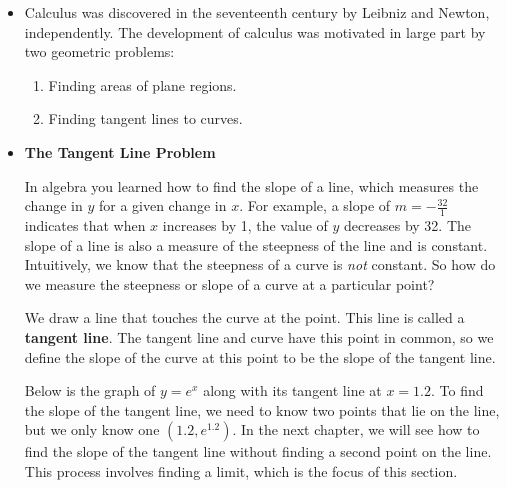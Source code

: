\documentclass{ximera}  %
\begin{document}
\begin{itemize}
    \item Calculus was discovered in the seventeenth century by
    Leibniz and Newton, independently.  The development of calculus was
    motivated in large part by two geometric problems:
    
    \begin{enumerate}
    \item Finding areas of plane regions.
    
    \item Finding tangent lines to curves.
    \end{enumerate}
    
    
    \vspace{0.1in}
    \item \textbf{The Tangent Line Problem}
    
    In algebra you learned how to find the slope of a line, which
    measures the change in $y$ for a given change in $x.$ For example,
    a slope of $m=-\frac{32}{1}$ indicates that when $x$ increases by
    1, the value of $y$ decreases by 32. The slope of a line is also a
    measure of the steepness of the line and is constant. Intuitively,
    we know that the steepness of a curve is \emph{not} constant.  So
    how do we measure the steepness or slope of a curve at a
    particular point?
    
    \vspace{0.1in} We draw a line that touches the curve at the point.
    This line is called a \textbf{tangent line}. The tangent line and
    curve have this point in common, so we define the slope of the
    curve at this point to be the slope of the tangent line.
    
    \vspace{0.2in} 
    
    \vspace{0.2in}
    Below is the graph of $y=e^x$ along
    with its tangent line at $x=1.2.$  To find the slope of the tangent line, we need to
    know two points that lie on the line, but we only know one $(1.2,
    e^{1.2}).$ In the next chapter, we will see how to find the slope
    of the tangent line without finding a second point on the line.
    This process involves finding a limit, which is the focus of this
    section.
    

\end{itemize}
\end{document}

